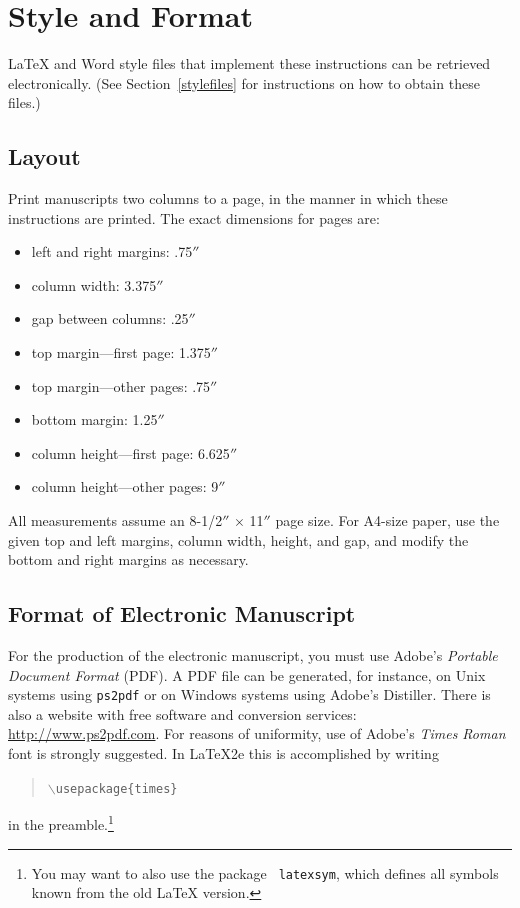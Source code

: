 \documentclass{article}
\begin{document}
\section{Style and Format}

\LaTeX{} and Word style files that implement these instructions
can be retrieved electronically. (See Section~\ref{stylefiles} for
instructions on how to obtain these files.)

\subsection{Layout}

Print manuscripts two columns to a page, in the manner in which these
instructions are printed. The exact dimensions for pages are:
\begin{itemize}
	\item left and right margins: .75$''$
	\item column width: 3.375$''$
	\item gap between columns: .25$''$
	\item top margin---first page: 1.375$''$
	\item top margin---other pages: .75$''$
	\item bottom margin: 1.25$''$
	\item column height---first page: 6.625$''$
	\item column height---other pages: 9$''$
\end{itemize}

All measurements assume an 8-1/2$''$ $\times$ 11$''$ page size. For
A4-size paper, use the given top and left margins, column width,
height, and gap, and modify the bottom and right margins as necessary.

\subsection{Format of Electronic Manuscript}

For the production of the electronic manuscript, you must use Adobe's
{\em Portable Document Format} (PDF). A PDF file can be generated, for
instance, on Unix systems using {\tt ps2pdf} or on Windows systems
using Adobe's Distiller. There is also a website with free software
and conversion services: \url{http://www.ps2pdf.com}. For reasons of
uniformity, use of Adobe's {\em Times Roman} font is strongly suggested.
In \LaTeX2e{} this is accomplished by writing
\begin{quote}
	\mbox{\tt $\backslash$usepackage\{times\}}
\end{quote}
in the preamble.\footnote{You may want to also use the package {\tt
			latexsym}, which defines all symbols known from the old \LaTeX{}
	version.}
\end{document}
